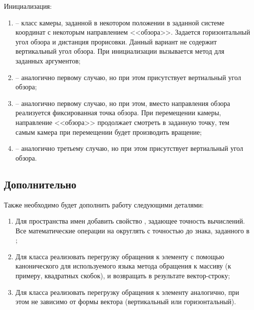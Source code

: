 	\noindent Инициализация:
	\begin{enumerate}
		\item {} -- класс камеры, заданной в некотором положении в заданной системе координат с некоторым направлением <<обзора>>. Задается горизонтальный угол обзора и дистанция прорисовки. Данный вариант не содержит вертикальный угол обзора. При инициализации вызывается метод  для заданных аргументов;
		\item {} -- аналогично первому случаю, но при этом присутствует вертиальный угол обзора;
		\item {} -- аналогично первому случаю, но при этом, вместо направления обзора реализуется фиксированная точка обзора. При перемещении камеры, направление <<обзора>> продолжает смотреть в заданную точку, тем самым камера при перемещении будет производить вращение;
		\item {} -- аналогично третьему случаю, но при этом присутствует вертиальный угол обзора.
	\end{enumerate}

\subsection{Дополнительно}

	Также необходимо будет дополнить работу следующими деталями:

	\begin{enumerate}
		\item Для пространства имен  добавить свойство , задающее точность вычислений. Все математические операции на  округлять с точностью до знака, заданного в ;
		\item Для класса  реализовать перегрузку обращения к элементу с помощью канонического для используемого языка метода обращения к массиву (к примеру, квадратных скобок), и возвращать в результате вектор-строку;
		\item Для класса  реализовать перегрузку обращения к элементу аналогично, при этом не зависимо от формы вектора (вертикальный или горизонтальный).
		\end{enumerate}

